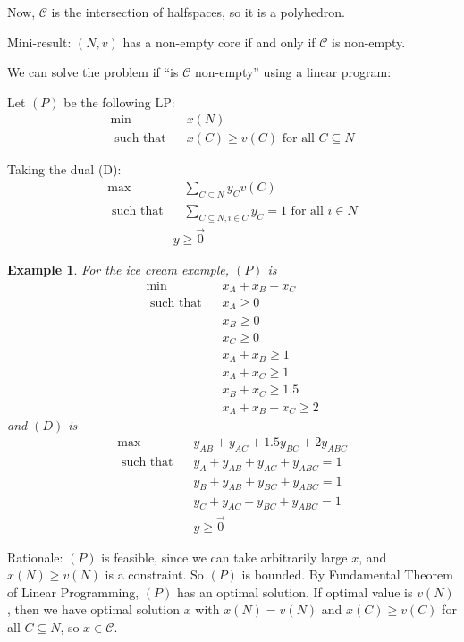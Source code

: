 \documentclass[twoside]{article}
\newtheorem{protoexample}[prototheorem]{Example}
\newenvironment{example}
{\colorlet{shadecolor}{red!15}\begin{shaded}\begin{protoexample}\normalfont}
		{\end{protoexample}\end{shaded}}
\begin{document}
Now, $\mathcal{C}$ is the intersection of halfspaces, so it is a polyhedron. 

Mini-result: $(N, v)$ has a non-empty core if and only if $\mathcal{C}$ is non-empty. 

We can solve the problem if ``is $\mathcal{C}$ non-empty'' using a linear program: 

Let $(P)$ be the following LP: \begin{align*}
\min &\;\;\;x(N)\\
\text{ such that} &\;\;\;x(C) \geq v(C) \text{ for all } C \subseteq N
\end{align*}

Taking the dual (D): \begin{align*}
\max &\;\;\;\sum_{C \subseteq N} y_Cv(C)\\
\text{ such that} &\;\;\;\sum_{C \subseteq N, i \in C} y_C = 1 \text{ for all } i \in N\\
& y \geq \vec{0}
\end{align*}

\begin{example}
	For the ice cream example, $(P)$ is \begin{align*}
	\min & \;\;\; x_A + x_B + x_C\\
	\text{ such that}&\;\;\;x_A \geq 0\\
	&\;\;\;x_B \geq 0\\
	&\;\;\;x_C \geq 0\\
	&\;\;\;x_A + x_B \geq 1\\
	&\;\;\;x_A + x_C \geq 1\\
	&\;\;\;x_B + x_C \geq 1.5\\
	&\;\;\;x_A + x_B + x_C \geq 2
	\end{align*}
	and $(D)$ is \begin{align*}
	\max & \;\;\; y_{AB} + y_{AC} + 1.5y_{BC} +2y_{ABC}\\
	\text{ such that}&\;\;\;y_A + y_{AB} + y_{AC} + y_{ABC} = 1\\
	&\;\;\;y_B + y_{AB} + y_{BC} + y_{ABC} = 1\\
	&\;\;\;y_C + y_{AC} + y_{BC} + y_{ABC} = 1\\
	&\;\;\;y\geq \vec{0}
	\end{align*}
\end{example}

Rationale: $(P)$ is feasible, since we can take arbitrarily large $x$, and $x(N) \geq v(N)$ is a constraint. So $(P)$ is bounded. By Fundamental Theorem of Linear Programming, $(P)$ has an optimal solution. If optimal value is $v(N)$, then we have optimal solution $x$ with $x(N) = v(N)$ and $x(C) \geq v(C)$ for all $C \subseteq N$, so $x \in \mathcal{C}$. 
\end{document}
